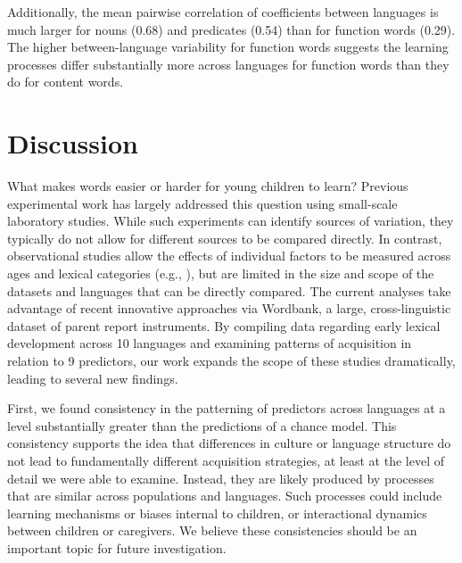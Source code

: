 \documentclass[
   11pt,
       ]{book}
\begin{document}
Additionally, the mean pairwise correlation of coefficients between languages is much larger for nouns (0.68) and predicates (0.54) than for function words (0.29). The higher between-language variability for function words suggests the learning processes differ substantially more across languages for function words than they do for content words.

\hypertarget{discussion}{%
\section{Discussion}\label{discussion}}

What makes words easier or harder for young children to learn? Previous experimental work has largely addressed this question using small-scale laboratory studies. While such experiments can identify sources of variation, they typically do not allow for different sources to be compared directly. In contrast, observational studies allow the effects of individual factors to be measured across ages and lexical categories (e.g., \citealp{goodman2008,hills2009,swingley2017}), but are limited in the size and scope of the datasets and languages that can be directly compared. The current analyses take advantage of recent innovative approaches via Wordbank, a large, cross-linguistic dataset of parent report instruments. By compiling data regarding early lexical development across 10 languages and examining patterns of acquisition in relation to 9 predictors, our work expands the scope of these studies dramatically, leading to several new findings.

First, we found consistency in the patterning of predictors across languages at a level substantially greater than the predictions of a chance model. This consistency supports the idea that differences in culture or language structure do not lead to fundamentally different acquisition strategies, at least at the level of detail we were able to examine. Instead, they are likely produced by processes that are similar across populations and languages. Such processes could include learning mechanisms or biases internal to children, or interactional dynamics between children or caregivers. We believe these consistencies should be an important topic for future investigation.
\end{document}
